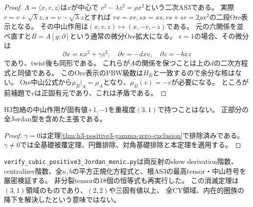 \begin{proof}
$A=\langle x,v,z\rangle$は$x$が中心で
$v^2-\lambda z^2=\rho x^2$という二次AS3である。
実際$r=v+\sqrt\lambda z,s=v-\sqrt\lambda z$とすれば
$rx=xr,sx=xs,rs+sr=2\rho x^2$の二段Ore表示となる。
その中山作用は$(x,v,z)\mapsto(x,-v,-z)$である。
元の六関係を並べ直すと$B=A[y;\partial]$という通常の微分Ore拡大になる。
$\epsilon=1$の場合、その微分は
\[
 \partial x=\kappa x^2+\gamma z^2,\quad
 \partial v=-dxv,\quad \partial z=-b xz
\]
であり、twist後も同形である。
これらが$A$の関係を保つことは上の$d$の二次方程式と同値である。
このOre表示のPBW級数は$H_B$と一致するので余分な核はない。
Ore中山公式から$\mu_B|_A=\mu_A$となり、$\mu_B(v)=-v$が必要になる。
ところが前補題で$v$は正固有元であり、これは矛盾である。
\end{proof}

\begin{corollary}
\label{cor:h3-positive3-total-exclusion}
H3包絡の中山作用が固有値$+1,-1$を重複度$(3,1)$で持つことはない。
正部分の全Jordan型を含めた主張である。
\end{corollary}
\begin{proof}
$\gamma=0$は定理\ref{thm:h3-positive3-gamma-zero-exclusion}で排除済みである。
$\gamma\ne0$では全基礎被覆定理、円錐排除、対角基礎排除と本定理を適用する。
\end{proof}

\texttt{verify\_cubic\_positive3\_Jordan\_monic.py}は両反射のskew derivation階数、
centralizer階数、全$\kappa,b$の平方正規化方程式と、根AS3の最高tensor・中山符号を厳密検証する。
非分裂tensorの18個の恒等式も再実行した。
この消滅定理は$(3,1)$領域のものであり、$(2,2)$や三固有値以上、
全CY領域、内在的圏族の降下を解決したという意味ではない。
